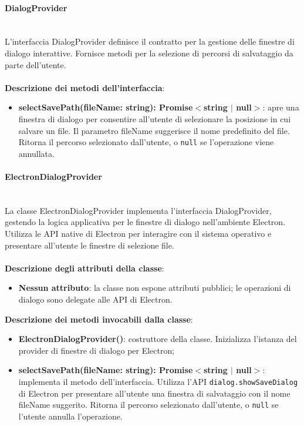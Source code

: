 \documentclass[a4paper,12pt]{article}
\begin{document}
{{{                \paragraph{DialogProvider}\label{par:DialogProvider}\mbox{}\\
                L'interfaccia DialogProvider definisce il contratto per la gestione delle finestre di dialogo interattive. Fornisce metodi per la selezione di percorsi di salvataggio da parte dell'utente.\\
                \\
                \noindent \textbf{Descrizione dei metodi dell'interfaccia}:
                \begin{itemize}
                    \item \textbf{selectSavePath(fileName: string): Promise$<$string $|$ null$>$}: apre una finestra di dialogo per consentire all'utente di selezionare la posizione in cui salvare un file. Il parametro fileName suggerisce il nome predefinito del file. Ritorna il percorso selezionato dall'utente, o \texttt{null} se l'operazione viene annullata.
                \end{itemize}
                \paragraph{ElectronDialogProvider}\label{par:ElectronDialogProvider}\mbox{}\\
                La classe ElectronDialogProvider implementa l'interfaccia DialogProvider, gestendo la logica applicativa per le finestre di dialogo nell'ambiente Electron. Utilizza le API native di Electron per interagire con il sistema operativo e presentare all'utente le finestre di selezione file.\\
                \\
                \textbf{Descrizione degli attributi della classe}:
                \begin{itemize}
                    \item \textbf{Nessun attributo}: la classe non espone attributi pubblici; le operazioni di dialogo sono delegate alle API di Electron.
                \end{itemize}
                
                \noindent \textbf{Descrizione dei metodi invocabili dalla classe}:
                \begin{itemize}
                    \item \textbf{ElectronDialogProvider()}: costruttore della classe. Inizializza l'istanza del provider di finestre di dialogo per Electron;
                    \item \textbf{selectSavePath(fileName: string): Promise$<$string $|$ null$>$}: implementa il metodo dell'interfaccia. Utilizza l'API \texttt{dialog.showSaveDialog} di Electron per presentare all'utente una finestra di salvataggio con il nome fileName suggerito. Ritorna il percorso selezionato dall'utente, o \texttt{null} se l'utente annulla l'operazione.
                \end{itemize}
}}}
\end{document}

